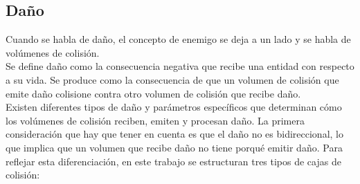 \subsection{Daño}
Cuando se habla de daño, el concepto de enemigo se deja a un lado y se habla de volúmenes de colisión.\\
Se define daño como la consecuencia negativa que recibe una entidad con respecto a su vida. Se produce como la consecuencia de que un volumen de colisión que emite daño colisione contra otro volumen de colisión que recibe daño.\\
Existen diferentes tipos de daño y parámetros específicos que determinan cómo los volúmenes de colisión reciben, emiten y procesan daño.
La primera consideración que hay que tener en cuenta es que el daño no es bidireccional, lo que implica que un volumen que recibe daño no tiene porqué emitir daño. Para reflejar esta diferenciación, en este trabajo se estructuran tres tipos de cajas de colisión:

